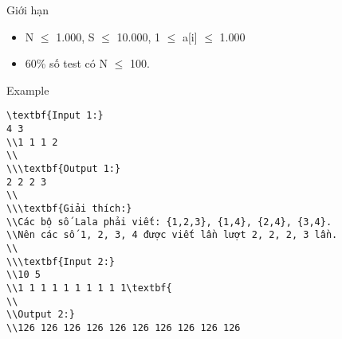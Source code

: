 Giới hạn
\begin{itemize}
	\item     N  $\le$  1.000, S  $\le$  10.000, 1 $\le$  a[i]  $\le$  1.000   
	\item     60\% số test có N  $\le$  100.   
\end{itemize}
Example
\begin{verbatim}
\textbf{Input 1:}
4 3
\\1 1 1 2
\\
\\\textbf{Output 1:}
2 2 2 3 
\\
\\\textbf{Giải thích:}
\\Các bộ số Lala phải viết: {1,2,3}, {1,4}, {2,4}, {3,4}. 
\\Nên các số 1, 2, 3, 4 được viết lần lượt 2, 2, 2, 3 lần.
\\
\\\textbf{Input 2:}
\\10 5
\\1 1 1 1 1 1 1 1 1 1\textbf{
\\
\\Output 2:}
\\126 126 126 126 126 126 126 126 126 126 \end{verbatim}